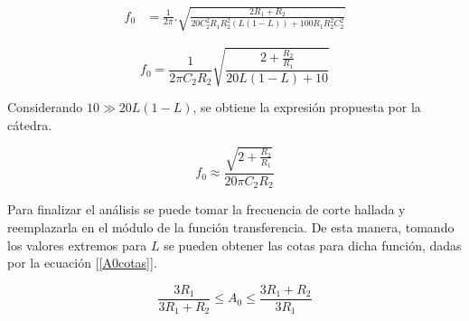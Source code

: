 \vspace{2mm}
\begin{align}
		f_0 &= \frac{1}{2\pi} . \sqrt{ \frac{2R_1 + R_2 }{ 20 C_2^2 R_1 R_2^2 (L (1-L)) + 100R_1 R_2^2C_2^2 } }
\end{align}
\vspace{2mm}


\begin{equation}
	f_0 = \frac{1}{2\pi C_2 R_2} \sqrt{ \frac{2 + \frac{R_2}{R_1} }{ 20L(1-L) + 10 } }	
	\label{f0sinsimplificar}
\end{equation}
\vspace{3mm}

Considerando $10 \gg 20L(1-L)$, se obtiene la expresión propuesta por la cátedra.

\vspace{2mm}
\begin{equation}
		f_0 \approx \frac{ \sqrt{ 2 + \frac{R_2}{R_1} } }{ 20\pi C_2 R_2 }
		\label{f0final}
\end{equation}
\vspace{2mm}

Para finalizar el análisis se puede tomar la frecuencia de corte hallada 
y reemplazarla en el módulo de la función transferencia. De esta manera, 
tomando los valores extremos para $L$ se pueden obtener 
 las cotas para dicha función, 
dadas por la ecuación [\ref{A0cotas}].

\vspace{2mm}
\begin{equation}
		\frac{3R_1}{3R_1+R_2} \leq  A_0 \leq\frac{3R_1+R_2}{3R_1}
		\label{A0cotas}
\end{equation}
\vspace{2mm}



	


